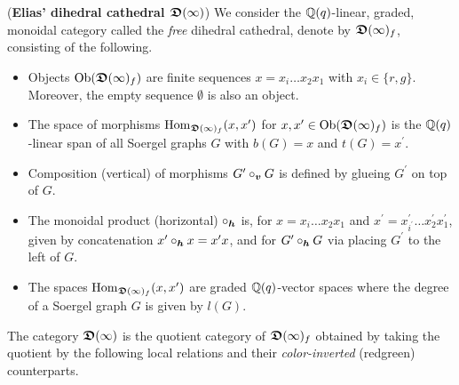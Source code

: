 \begin{defn}(\textbf{Elias' dihedral cathedral $\boldsymbol{\mathfrak{D}}(\infty)$})\label{defn-diacath} We 
consider the $\mathbb{Q}(q)$-linear, graded, monoidal category 
called the \textit{free} dihedral cathedral, 
denote by $\boldsymbol{\mathfrak{D}}(\infty)_{f}$, consisting of the following.
\begin{itemize}
\item Objects $\mathrm{Ob}(\boldsymbol{\mathfrak{D}}(\infty)_f)$ are finite 
sequences $x=x_i\dots x_2x_1$ with 
$x_i\in\{r,g\}$. Moreover, the empty sequence $\emptyset$ is also an object.
\item The space of morphisms 
$\mathrm{Hom}_{\boldsymbol{\mathfrak{D}}(\infty)_f}(x,x^{\prime})$ for 
$x,x^{\prime}\in\mathrm{Ob}(\boldsymbol{\mathfrak{D}}(\infty)_f)$ is the 
$\mathbb{Q}(q)$-linear span of all Soergel graphs $G$ with $b(G)=x$ and $t(G)=x^{\prime}$.
\item Composition (vertical) of morphisms 
$G^{\prime}\circ_{\boldsymbol{v}} G$ is defined by 
glueing $G^{\prime}$ on top of $G$.
\item The monoidal product (horizontal) $\circ_{\boldsymbol{h}}$ is, 
for $x=x_i\dots x_2x_1$ and 
$x^{\prime}=x^{\prime}_{i^{\prime}}\dots x^{\prime}_2x^{\prime}_1$, 
given by concatenation $x^{\prime}\circ_{\boldsymbol{h}} x=x^{\prime}x$, and 
for $G^{\prime}\circ_{\boldsymbol{h}} G$ via placing 
$G^{\prime}$ to the left of $G$.
\item The spaces $\mathrm{Hom}_{\boldsymbol{\mathfrak{D}}(\infty)_f}(x,x^{\prime})$ 
are graded $\mathbb{Q}(q)$-vector spaces where the 
degree of a Soergel graph $G$ is given by $l(G)$. 
\end{itemize}
The category $\boldsymbol{\mathfrak{D}}(\infty)$ is 
the quotient category of $\boldsymbol{\mathfrak{D}}(\infty)_f$ obtained 
by taking the quotient by the following local 
relations and their 
\textit{color-inverted} (red\raisebox{-0.05cm}{$\leftrightarrows$}green) counterparts.




\end{defn}
